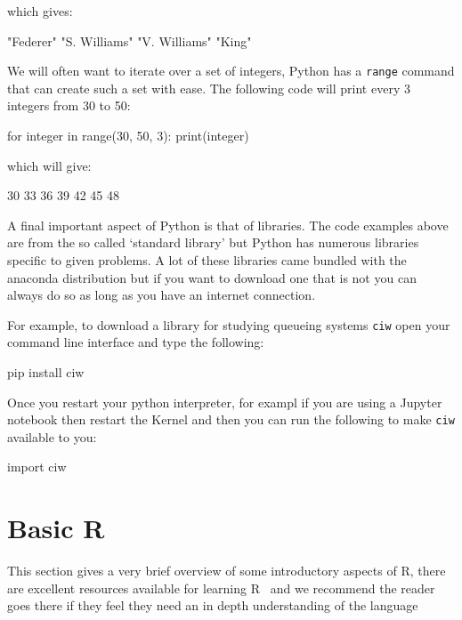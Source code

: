 which gives:

\begin{pyout}
"Federer"
"S. Williams"
"V. Williams"
"King"
\end{pyout}

We will often want to iterate over a set of integers, Python has a
\texttt{range} command that can create such a set with ease. The following
code will print every 3 integers from 30 to 50:


\begin{pyin}
for integer in range(30, 50, 3):
    print(integer)
\end{pyin}

which will give:

\begin{pyout}
30
33
36
39
42
45
48
\end{pyout}

A final important aspect of Python is that of libraries. The code examples above
are from the so called `standard library' but Python has numerous libraries
specific to given problems. A lot of these libraries came bundled with the
anaconda distribution but if you want to download one that is not you can always
do so as long as you have an internet connection.

For example, to download a library for studying queueing systems
\texttt{ciw} open your command line interface and type the
following:

\begin{cliin}
pip install ciw
\end{cliin}

Once you restart your python interpreter, for exampl if you are using a Jupyter
notebook then restart the Kernel and then you can run the following to make
\texttt{ciw} available to you:

\begin{pyin}
import ciw
\end{pyin}

\section{Basic R}\label{sec:basic-R}

This section gives a very brief overview of some introductory aspects of R,
there are excellent resources available for learning
R~\cite{wickham2014advanced} %
and we recommend the
reader goes there if they feel they need an in depth understanding of the
language %

